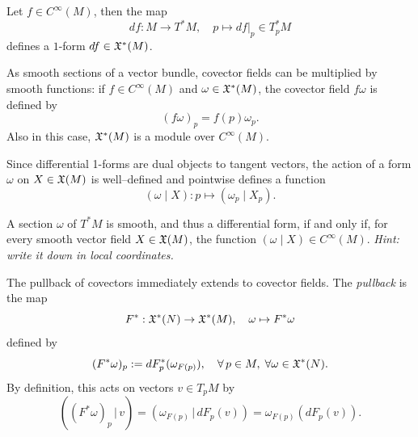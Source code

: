 \begin{example}
	Let $f\in C^\infty(M)$, then the map
	\begin{equation}
		df : M \to T^*M, \quad p \mapsto df|_p \in T^*_p M
	\end{equation}
	defines a $1$-form $df\in\mathfrak{X}^*(M)$.
\end{example}

As smooth sections of a vector bundle, covector fields can be multiplied by smooth functions: if $f\in C^\infty(M)$ and $\omega\in\mathfrak{X}^*(M)$, the covector field $f\omega$ is defined by
\begin{equation}
	(f\omega)_p = f(p)\omega_p.
\end{equation}
Also in this case, $\mathfrak{X}^*(M)$ is a module over $C^\infty(M)$.

Since differential 1-forms are dual objects to tangent vectors, the action of a form $\omega$ on $X\in\mathfrak{X}(M)$ is well--defined and pointwise defines a function
\begin{equation}
	(\omega \mid X) : p \mapsto (\omega_p \mid X_p).
\end{equation}

\begin{exercise}
	A section $\omega$ of $T^*M$ is smooth, and thus a differential form, if and only if, for every smooth vector field $X\in\mathfrak{X}(M)$, the function $(\omega \mid X)\in C^\infty(M)$.
	\textit{\small Hint: write it down in local coordinates.}
\end{exercise}

\begin{definition}\label{def:pullback1f}
	The pullback of covectors immediately extends to covector fields.
	The \emph{pullback} is the map
	\begin{equation}
		F^*: \mathfrak{X}^*(N) \to \mathfrak{X}^*(M), \quad \omega \mapsto F^* \omega
	\end{equation}
	defined by
	\begin{equation}
		(F^*\omega)_p := dF_p^*(\omega_{F(p)}), \quad \forall\, p\in M, \; \forall \omega\in\mathfrak{X}^*(N).
	\end{equation}
	By definition, this acts on vectors $v\in T_p M$ by
	\begin{equation}
		((F^*\omega)_p \,|\, v) = (\omega_{F(p)} \,|\, dF_p(v)) = \omega_{F(p)}(dF_p(v)).
	\end{equation}
\end{definition}

